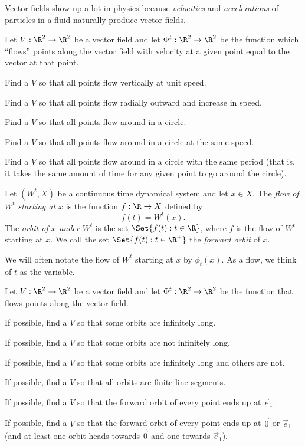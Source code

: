 	Vector fields show up a lot in physics because \emph{velocities} and \emph{accelerations} of particles in a fluid
	naturally produce vector fields.

	\question
		Let $V:\R^2\to\R^2$ be a vector field and let $\Phi^t:\R^2\to\R^2$ be the function which ``flows'' points along
		the vector field with velocity at a given point equal to the vector at that point.
	\begin{parts}
		\item Find a $V$ so that all points flow vertically at unit speed.
		\item Find a $V$ so that all points flow radially outward and increase in speed.
		\item Find a $V$ so that all points flow around in a circle.
		\item Find a $V$ so that all points flow around in a circle at the same speed.
		\item Find a $V$ so that all points flow around in a circle with the same period (that is, it takes the same
			amount of time for any given point to go around the circle).
	\end{parts}

	\begin{definition}
		Let $(W^t,X)$ be a continuous time dynamical system and let $x\in X$. 
		The \emph{flow of $W^t$ starting at $x$} is the function $f:\R\to X$ defined by
		\[
			f(t) = W^t(x).
		\]
		The \emph{orbit of $x$ under $W^t$} is the set $\Set{f(t):t\in \R}$, where $f$ is the flow of $W^t$
		starting at $x$. We call the set $\Set{f(t):t\in \R^+}$ the \emph{forward orbit} of $x$.
	\end{definition}
	We will often notate the flow of $W^t$ starting at $x$ by $\phi_t(x)$. As a flow, we think of $t$ as the variable.

	\question
		Let $V:\R^2\to\R^2$ be a vector field and let $\Phi^t:\R^2\to\R^2$ be the function that flows
		points along the vector field. 
	\begin{parts}
		\item If possible, find a $V$ so that some orbits are infinitely long.
		\item If possible, find a $V$ so that some orbits are not infinitely long.
		\item If possible, find a $V$ so that some orbits are infinitely long and others are not.
		\item If possible, find a $V$ so that all orbits are finite line segments.
		\item If possible, find a $V$ so that the forward orbit of every point ends up at $\vec e_1$.
		\item If possible, find a $V$ so that the forward orbit of every point ends up at $\vec 0$ or $\vec e_1$ (and
			at least one orbit heads towards $\vec 0$ and one towards $\vec e_1$).
	\end{parts}

